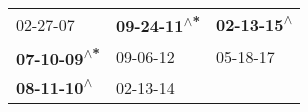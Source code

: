 \begin{supertabular}{lll}
                   02-27-07\textsuperscript{} &  \textbf{09-24-11\textsuperscript{$\wedge$*}} &  \textbf{02-13-15\textsuperscript{$\wedge$}} \\
 \textbf{07-10-09\textsuperscript{$\wedge$*}} &                    09-06-12\textsuperscript{} &                   05-18-17\textsuperscript{} \\
  \textbf{08-11-10\textsuperscript{$\wedge$}} &                    02-13-14\textsuperscript{} &                                              \\
\end{supertabular}
